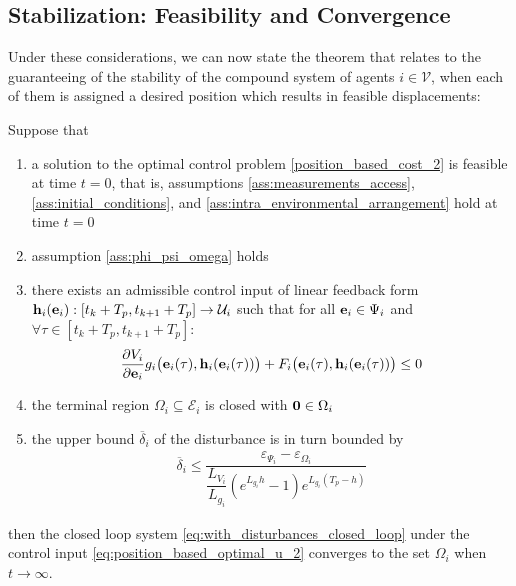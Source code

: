 \subsection{Stabilization: Feasibility and Convergence}

Under these considerations, we can now state the theorem that relates to
the guaranteeing of the stability of the compound system of agents
$i \in \mathcal{V}$, when each of them is assigned a desired
position which results in feasible displacements:\\[2.5ex]

\begin{bw_box}
\begin{theorem}
  \label{theorem:with_disturbances}
  Suppose that

  \begin{enumerate}
    \item a solution to the optimal control problem \eqref{position_based_cost_2}
      is feasible at time $t=0$, that is, assumptions
      \eqref{ass:measurements_access}, \eqref{ass:initial_conditions}, and
      \eqref{ass:intra_environmental_arrangement} hold at time $t=0$
    \item assumption \eqref{ass:phi_psi_omega} holds
    \item there exists an admissible control input of linear feedback form
      $\bm{\mathbf{h}}_i(\bm{\mathbf{e}}_i) : [t_k + T_p, t_{k+1} + T_p] \to \mathcal{U}_i$
      such that for all $\bm{\mathbf{e}}_i \in \Psi_i$ and $\forall \tau \in
      [t_k + T_p, t_{k+1} + T_p]$:
      \begin{align}
        \dfrac{\partial V_i}{\partial \bm{\mathbf{e}}_i} g_i\big(\bm{\mathbf{e}}_i(\tau), \bm{\mathbf{h}}_i(\bm{\mathbf{e}}_i(\tau))\big)
          + F_i\big(\bm{\mathbf{e}}_i(\tau), \bm{\mathbf{h}}_i(\bm{\mathbf{e}}_i(\tau))\big) \leq 0
      \end{align}
    \item the terminal region $\Omega_i \subseteq \mathcal{E}_i$ is
      closed with $\bm{\mathbf{0}} \in \Omega_i$
    \item the upper bound $\overline{\delta}_i$ of the disturbance is in turn bounded by
      \begin{align}
        \overline{\delta}_i \leq \dfrac{\varepsilon_{\Psi_i} - \varepsilon_{\Omega_i}}{\dfrac{L_{V_i}}{L_{g_i}} (e^{L_{g_i}h} - 1) e^{L_{g_i} (T_p - h)}}
      \end{align}

  \end{enumerate}

  then the closed loop system \eqref{eq:with_disturbances_closed_loop} under
  the control input \eqref{eq:position_based_optimal_u_2} converges to the set
  $\Omega_i$ when $t \to \infty$.
\end{theorem}
\end{bw_box}

